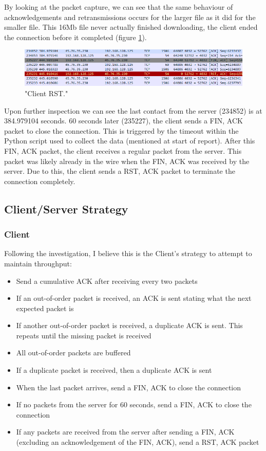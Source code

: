 \documentclass[12pt]{article}
\begin{document}
By looking at the packet capture, we can see that the same behaviour of acknowledgements and retransmissions occurs for the larger file as it did for the smaller file.
This 16Mb file never actually finished downloading, the client ended the connection before it completed (figure \ref{figure8: 4032:16M RST}).

\begin{figure}[!htbp]
  \centering
  \includegraphics[width=\linewidth]{4032-16M-RST.PNG}
  \caption{"Client RST."}
  \label{figure8: 4032:16M RST}
\end{figure}

Upon further inspection we can see the last contact from the server (234852) is at 384.979104 seconds.
60 seconds later (235227), the client sends a FIN, ACK packet to close the connection.
This is triggered by the timeout within the Python script used to collect the data (mentioned at start of report).
After this FIN, ACK packet, the client receives a regular packet from the server. 
This packet was likely already in the wire when the FIN, ACK was received by the server.
Due to this, the client sends a RST, ACK packet to terminate the connection completely.

\subsection*{Client/Server Strategy}
\subsubsection*{Client}
Following the investigation, I believe this is the Client's strategy to attempt to maintain throughput:
\begin{itemize}
  \item Send a cumulative ACK after receiving every two packets
  \item If an out-of-order packet is received, an ACK is sent stating what the next expected packet is
  \item If another out-of-order packet is received, a duplicate ACK is sent. This repeats until the missing packet is received
  \item All out-of-order packets are buffered
  \item If a duplicate packet is received, then a duplicate ACK is sent
  \item When the last packet arrives, send a FIN, ACK to close the connection
  \item If no packets from the server for 60 seconds, send a FIN, ACK to close the connection
  \item If any packets are received from the server after sending a FIN, ACK (excluding an acknowledgement of the FIN, ACK), send a RST, ACK packet
\end{itemize}
\end{document}

